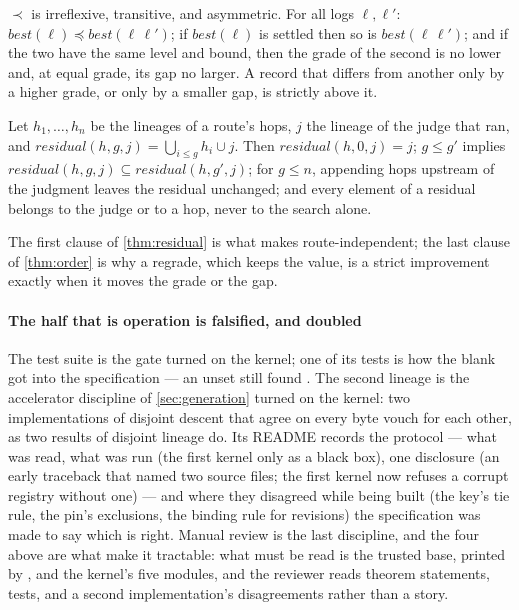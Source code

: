 \begin{theorem}
\label{thm:order}
$\prec$ is irreflexive, transitive, and asymmetric. For all logs
$\ell, \ell'$: $\textit{best}(\ell) \preceq
\textit{best}(\ell\,\ell')$; if $\textit{best}(\ell)$ is settled then
so is $\textit{best}(\ell\,\ell')$; and if the two have
the same level and bound, then the grade of the second is no lower
and, at equal grade, its gap no larger. A record that differs from
another only by a higher grade, or only by a smaller gap, is strictly
above it.
\end{theorem}

\begin{theorem}
\label{thm:residual}
Let $h_1, \dots, h_n$ be the lineages of a route's hops, $j$ the
lineage of the judge that ran, and
$\textit{residual}(h, g, j) = \bigcup_{i \le g} h_i \cup j$. Then
$\textit{residual}(h, 0, j) = j$; $g \le g'$ implies
$\textit{residual}(h, g, j) \subseteq \textit{residual}(h, g', j)$;
for $g \le n$, appending hops upstream of the judgment leaves the
residual unchanged; and every element of a residual belongs to the
judge or to a hop, never to the search alone.
\end{theorem}

The first clause of \cref{thm:residual} is what makes
 route-independent; the last clause of
\cref{thm:order} is why a regrade, which keeps the value, is a strict
improvement exactly when it moves the grade or the gap.

\paragraph{The half that is operation is falsified, and doubled}
The test suite is the gate turned on the kernel; one of its tests is
how the blank  got into the specification --- an unset
 still found . The second lineage is
the accelerator discipline of \cref{sec:generation} turned on the
kernel: two implementations of disjoint descent that agree on every
byte vouch for each other, as two results of disjoint lineage do. Its README records the
protocol --- what was read, what was run (the first kernel only as a
black box), one disclosure (an early traceback that named two source
files; the first kernel now refuses a corrupt registry without one)
--- and where they disagreed while being built (the key's tie rule,
the pin's exclusions, the binding rule for revisions) the
specification was made to say which is right. Manual review is the
last discipline, and the four above are what make it tractable: what
must be read is the trusted base, printed by , and the
kernel's five modules, and the reviewer reads theorem statements,
tests, and a second implementation's disagreements rather than a
story.
